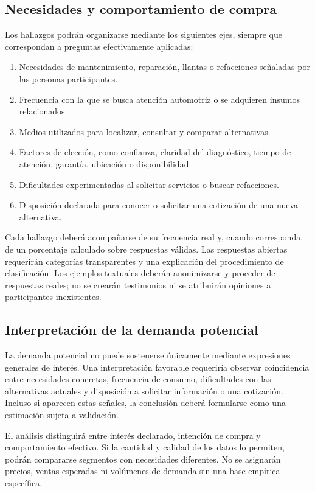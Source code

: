 \documentclass[12pt,letterpaper,oneside]{article}
\begin{document}
\subsection{Necesidades y comportamiento de compra}

Los hallazgos podrán organizarse mediante los siguientes ejes, siempre que correspondan a preguntas efectivamente aplicadas:

\begin{enumerate}
    \item Necesidades de mantenimiento, reparación, llantas o refacciones señaladas por las personas participantes.
    \item Frecuencia con la que se busca atención automotriz o se adquieren insumos relacionados.
    \item Medios utilizados para localizar, consultar y comparar alternativas.
    \item Factores de elección, como confianza, claridad del diagnóstico, tiempo de atención, garantía, ubicación o disponibilidad.
    \item Dificultades experimentadas al solicitar servicios o buscar refacciones.
    \item Disposición declarada para conocer o solicitar una cotización de una nueva alternativa.
\end{enumerate}

Cada hallazgo deberá acompañarse de su frecuencia real y, cuando corresponda, de un porcentaje calculado sobre respuestas válidas. Las respuestas abiertas requerirán categorías transparentes y una explicación del procedimiento de clasificación. Los ejemplos textuales deberán anonimizarse y proceder de respuestas reales; no se crearán testimonios ni se atribuirán opiniones a participantes inexistentes.

\subsection{Interpretación de la demanda potencial}

La demanda potencial no puede sostenerse únicamente mediante expresiones generales de interés. Una interpretación favorable requeriría observar coincidencia entre necesidades concretas, frecuencia de consumo, dificultades con las alternativas actuales y disposición a solicitar información o una cotización. Incluso si aparecen estas señales, la conclusión deberá formularse como una estimación sujeta a validación.

El análisis distinguirá entre interés declarado, intención de compra y comportamiento efectivo. Si la cantidad y calidad de los datos lo permiten, podrán compararse segmentos con necesidades diferentes. No se asignarán precios, ventas esperadas ni volúmenes de demanda sin una base empírica específica.
\end{document}

